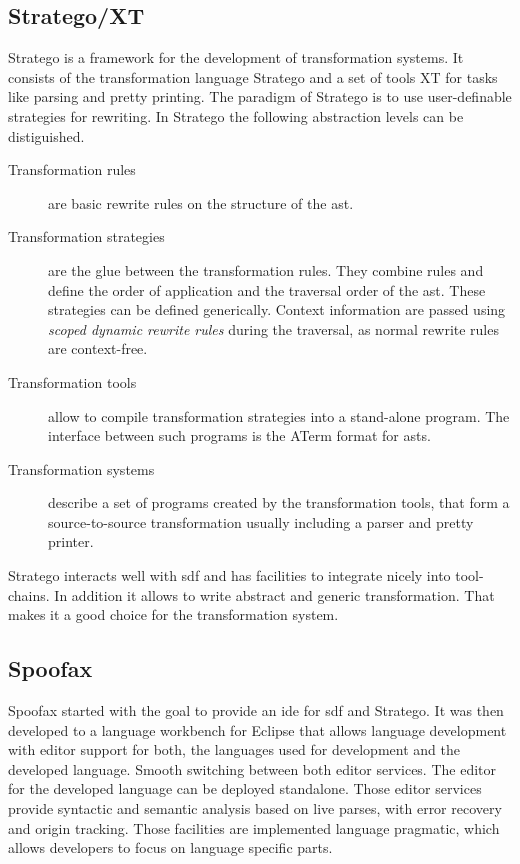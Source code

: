\subsection{Stratego/XT}
Stratego is a framework for the development of transformation
systems. It consists of the transformation language Stratego and a set
of tools XT for tasks like parsing and pretty printing. The paradigm
of Stratego is to use user-definable strategies for
rewriting. In Stratego the following abstraction levels can be
distiguished.

\begin{description}
\item[Transformation rules] are basic rewrite rules on the structure
  of the \gls{ast}.
\item[Transformation strategies] are the glue between the
  transformation rules. They combine rules and define the order of
  application and the traversal order of the \gls{ast}. These strategies can
  be defined generically. Context information are passed using
  \textit{scoped dynamic rewrite rules} during the traversal, as
  normal rewrite rules are context-free.
\item[Transformation tools] allow to compile transformation strategies
  into a stand-alone program. The interface between such programs is
  the ATerm format for \glspl{ast}.
\item[Transformation systems] describe a set of programs created by
  the transformation tools, that form a source-to-source
  transformation usually including a parser and pretty printer.
\end{description}


Stratego interacts well with \gls{sdf} and has facilities to integrate
nicely into tool-chains. In addition it allows to write abstract and
generic transformation. That makes it a good choice for the
transformation system.
\subsection{Spoofax}
Spoofax started with the goal to provide an \gls{ide} for \gls{sdf} and
Stratego. It was then developed to a language workbench for Eclipse
that allows language development with editor support for both, the
languages used for development and the developed language. Smooth
switching between both editor services. The editor for the developed
language can be deployed standalone. Those editor services provide
syntactic and semantic analysis based on live parses, with error
recovery and origin tracking. Those facilities are implemented
language pragmatic, which allows developers to focus on language
specific parts.

